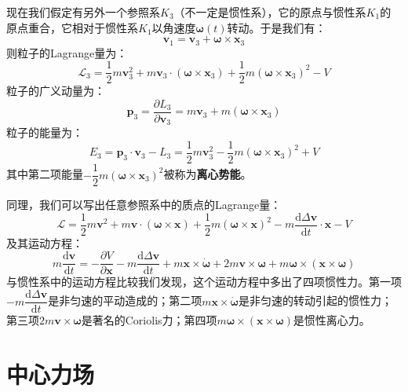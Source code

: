 \documentclass[a4paper,openany]{book}
\begin{document}
现在我们假定有另外一个参照系$K_3$（不一定是惯性系），它的原点与惯性系$K_1$的原点重合，它相对于惯性系$K_1$以角速度$\bm{\omega}(t)$转动。于是我们有：
\[
    \bm{v}_1 = \bm{v}_3 + \bm{\omega}\times\bm{x}_3
\]
则粒子的Lagrange量为：
\[
    \mathcal{L}_3 = \frac{1}{2}m\bm{v}_3^2 + m\bm{v}_3\cdot(\bm{\omega}\times\bm{x}_3) + \frac{1}{2}m(\bm{\omega}\times\bm{x}_3)^2 - V
\]
粒子的广义动量为：
\[
    \bm{p}_3 = \frac{\partial L_3}{\partial\bm{v}_3} = m\bm{v}_3 + m(\bm{\omega}\times\bm{x}_3)
\]
粒子的能量为：
\[
    \boxed{E_3 = \bm{p}_3\cdot\bm{v}_3 - L_3 = \frac{1}{2}m\bm{v}_3^2 - \frac{1}{2}m(\bm{\omega}\times\bm{x}_3)^2 + V}
\]
其中第二项能量$\boxed{-\dfrac{1}{2}m(\bm{\omega}\times\bm{x}_3)^2}$被称为\textbf{离心势能}。

同理，我们可以写出任意参照系中的质点的Lagrange量：
\[
    \boxed{\mathcal{L} = \frac{1}{2}m\bm{v}^2 + m\bm{v}\cdot(\bm{\omega}\times\bm{x}) + \frac{1}{2}m(\bm{\omega}\times\bm{x})^2 - m\frac{\mathrm{d}\Delta\bm{v}}{\mathrm{d}t}\cdot\bm{x} - V}
\]
及其运动方程：
\[
    \boxed{m\frac{\mathrm{d}\bm{v}}{\mathrm{d}t} = -\frac{\partial V}{\partial\bm{x}} - m\frac{\mathrm{d}\Delta\bm{v}}{\mathrm{d}t} + m\bm{x}\times\bm{\dot{\omega}} + 2m\bm{v}\times\bm{\omega} + m\bm{\omega}\times(\bm{x}\times\bm{\omega})}
\]
与惯性系中的运动方程比较我们发现，这个运动方程中多出了四项惯性力。第一项$- m\dfrac{\mathrm{d}\Delta\bm{v}}{\mathrm{d}t}$是非匀速的平动造成的；第二项$m\bm{x}\times\bm{\dot{\omega}}$是非匀速的转动引起的惯性力；第三项$2m\bm{v}\times\bm{\omega}$是著名的Coriolis力；第四项$m\bm{\omega}\times(\bm{x}\times\bm{\omega})$是惯性离心力。

\chapter*{中心力场}
\end{document}
